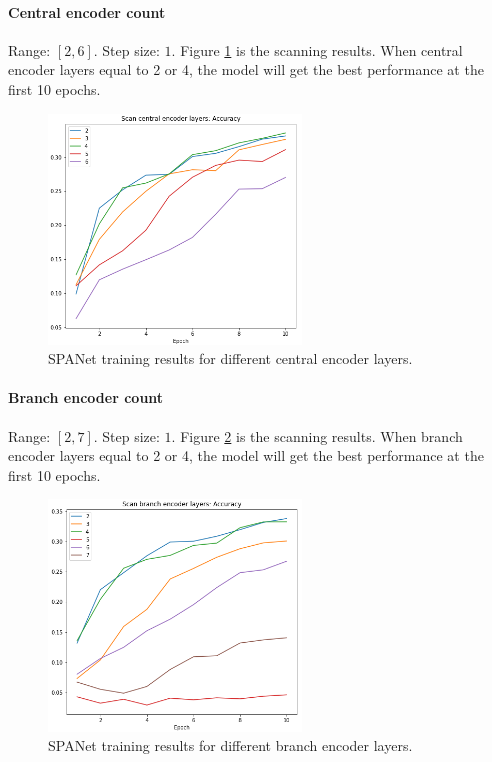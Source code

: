 \documentclass[12pt]{article}
\begin{document}
		\paragraph{Central encoder count} Range: $[2,6]$. Step size: $1$. Figure \ref{fig:SPANet_scan_n_cen} is the scanning results. When central encoder layers equal to 2 or 4, the model  will get the best performance at the first 10 epochs.
		\begin{figure}[htpb]
			\centering
			\includegraphics[width=0.6\textwidth]{accuracy_curve_hp_scan_n_cen.png}
			\caption{SPANet training results for different central encoder layers.}
			\label{fig:SPANet_scan_n_cen}
		\end{figure}

		\paragraph{Branch encoder count} Range: $[2,7]$. Step size: $1$. Figure \ref{fig:SPANet_scan_n_bren} is the scanning results. When branch encoder layers equal to 2 or 4, the model  will get the best performance at the first 10 epochs.
		\begin{figure}[htpb]
			\centering
			\includegraphics[width=0.6\textwidth]{accuracy_curve_hp_scan_n_bren.png}
			\caption{SPANet training results for different branch encoder layers.}
			\label{fig:SPANet_scan_n_bren}
		\end{figure}
\end{document}
